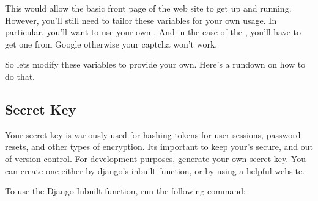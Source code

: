 \documentclass[letterpaper,10pt,english]{sphinxmanual}
\begin{document}
\begin{sphinxVerbatim}[commandchars=\\\{\}]
 
\end{sphinxVerbatim}

This would allow the basic front page of the web site to get up and running.
However, you’ll still need to tailor these variables for your own usage.
In particular, you’ll want to use your own .
And in the case of the , you’ll have to get one from Google otherwise your captcha won’t work.

So lets modify these variables to provide your own. Here’s a rundown on how to do that.


\subsection{Secret Key}
\label{\detokenize{guide/06_environment-variables:secret-key}}
Your secret key is variously used for hashing tokens for user sessions, password resets, and other types of encryption.   Its important to keep your’s secure, and out of version control.
For development purposes, generate your own secret key.  You can create one either by django’s inbuilt function, or by using a helpful website.

To use the Django Inbuilt function, run the following command:

\begin{sphinxVerbatim}[commandchars=\\\{\}]
 
    

 
    
\end{sphinxVerbatim}
\end{document}
